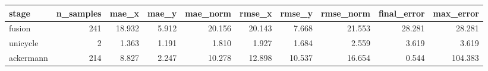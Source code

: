 \begin{tabular}{lrrrrrrrrr}
\hline
stage & n\_samples & mae\_x & mae\_y & mae\_norm & rmse\_x & rmse\_y & rmse\_norm & final\_error & max\_error \\
\hline
fusion & 241 & 18.932 & 5.912 & 20.156 & 20.143 & 7.668 & 21.553 & 28.281 & 28.281 \\
unicycle & 2 & 1.363 & 1.191 & 1.810 & 1.927 & 1.684 & 2.559 & 3.619 & 3.619 \\
ackermann & 214 & 8.827 & 2.247 & 10.278 & 12.898 & 10.537 & 16.654 & 0.544 & 104.383 \\
\hline
\end{tabular}